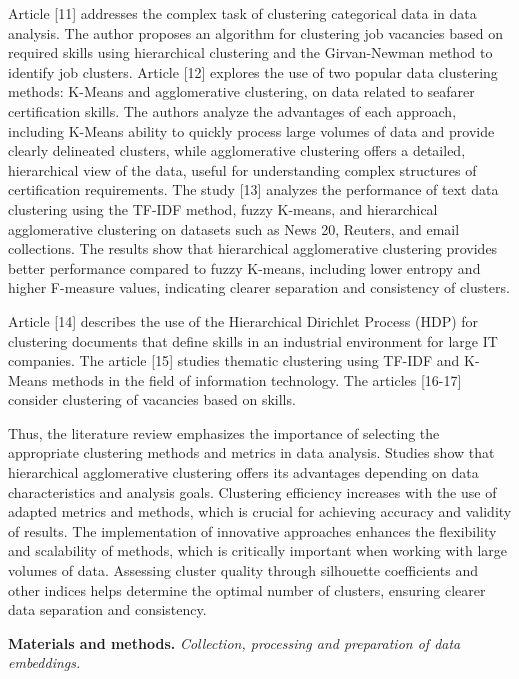 \begin{multicols}{2}
Article {[}11{]} addresses the complex task of clustering categorical
data in data analysis. The author proposes an algorithm for clustering
job vacancies based on required skills using hierarchical clustering and
the Girvan-Newman method to identify job clusters. Article {[}12{]}
explores the use of two popular data clustering methods: K-Means and
agglomerative clustering, on data related to seafarer certification
skills. The authors analyze the advantages of each approach, including
K-Means ability to quickly process large volumes of data and provide
clearly delineated clusters, while agglomerative clustering offers a
detailed, hierarchical view of the data, useful for understanding
complex structures of certification requirements. The study {[}13{]}
analyzes the performance of text data clustering using the TF-IDF
method, fuzzy K-means, and hierarchical agglomerative clustering on
datasets such as News 20, Reuters, and email collections. The results
show that hierarchical agglomerative clustering provides better
performance compared to fuzzy K-means, including lower entropy and
higher F-measure values, indicating clearer separation and consistency
of clusters.

Article {[}14{]} describes the use of the Hierarchical Dirichlet Process
(HDP) for clustering documents that define skills in an industrial
environment for large IT companies. The article {[}15{]} studies
thematic clustering using TF-IDF and K-Means methods in the field of
information technology. The articles {[}16-17{]} consider clustering of
vacancies based on skills.

Thus, the literature review emphasizes the importance of selecting the
appropriate clustering methods and metrics in data analysis. Studies
show that hierarchical agglomerative clustering offers its advantages
depending on data characteristics and analysis goals. Clustering
efficiency increases with the use of adapted metrics and methods, which
is crucial for achieving accuracy and validity of results. The
implementation of innovative approaches enhances the flexibility and
scalability of methods, which is critically important when working with
large volumes of data. Assessing cluster quality through silhouette
coefficients and other indices helps determine the optimal number of
clusters, ensuring clearer data separation and consistency.

{\bfseries Materials and methods.} \emph{Collection, processing and
preparation of data embeddings.}


\end{multicols}
